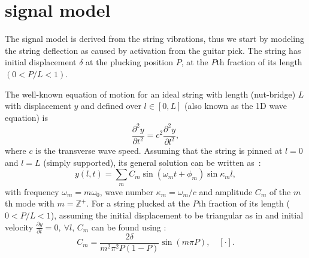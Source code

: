 
\section{signal model}
The signal model is derived from the string vibrations, thus we start by modeling the string 
deflection as caused by activation from the guitar pick. 
%
The string has initial displacement $\delta$ at the plucking position $P$, at the
$P$th fraction of its length $(0<P/L<1)$. %

The well-known equation of motion for an ideal string with length (nut-bridge) $L$ with displacement $y$ and defined over $l \in [0, L]$ (also known as the 1D wave equation) is
%
\begin{equation}
\frac{\partial^2y}{\partial t^2} = c^2\frac{\partial^2y}{\partial l^2},
\end{equation}
%
where $c$ is the transverse wave speed. Assuming that the string is pinned at $l=0$ and $l=L$ (simply supported), its general solution can be written as~\cite{fletcher:physics_of_musical_instruments}:
%
\begin{equation}\label{eq:modalSum}
    y(l,t) = \sum_m C_m\sin(\omega_mt+\phi_m)\sin\kappa_ml,
\end{equation}
%
with frequency $\omega_m = m\omega_0$, wave number $\kappa_m = \omega_m / c$ and amplitude $C_m$ of the $m$th mode with $m = \mathbb{Z}^+$. For a string plucked at the $P$th fraction of its length ($0<P/L<1$), assuming the initial displacement to be triangular as in \cite{fletcher:physics_of_musical_instruments} and initial velocity $\frac{\partial y}{\partial t} = 0, \ \forall l$, $C_m$ can be found using \cite{donkin:acoustics}:
\begin{equation}
    C_m = \frac{2\delta}{m^2\pi^2P(1-P)}\sin(m\pi P), \quad [\cdot].
\end{equation}